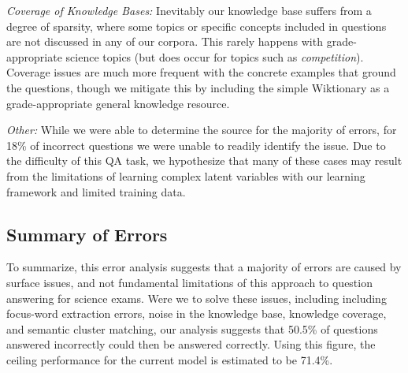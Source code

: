 {\flushleft \emph{Coverage of Knowledge Bases: }}
Inevitably our knowledge base suffers from a degree of sparsity, where some topics or specific concepts included in questions are not discussed in any of our corpora.  This rarely happens with grade-appropriate science topics (but does occur for topics such as \emph{competition}).  Coverage issues are much more frequent with the concrete examples that ground the questions, though we  mitigate this by including the simple Wiktionary as a grade-appropriate general knowledge resource.

{\flushleft \emph{Other: }}
While we were able to determine the source for the majority of errors, for 18\% of incorrect questions we were unable to readily identify the issue.  Due to the difficulty of this QA task, we hypothesize that many of these cases may result from the limitations of learning complex latent variables with our learning framework and limited training data. 



\subsection{Summary of Errors}

\vspace{1mm}
To summarize, this error analysis suggests that a majority of errors are caused by surface issues, and not fundamental limitations of this approach to question answering for science exams.  Were we to solve these issues, including including focus-word extraction errors, noise in the knowledge base, knowledge coverage, and semantic cluster matching, our analysis suggests that 50.5\% of questions answered incorrectly could then be answered correctly.  Using this figure, the ceiling performance for the current model is estimated to be 71.4\%. 

